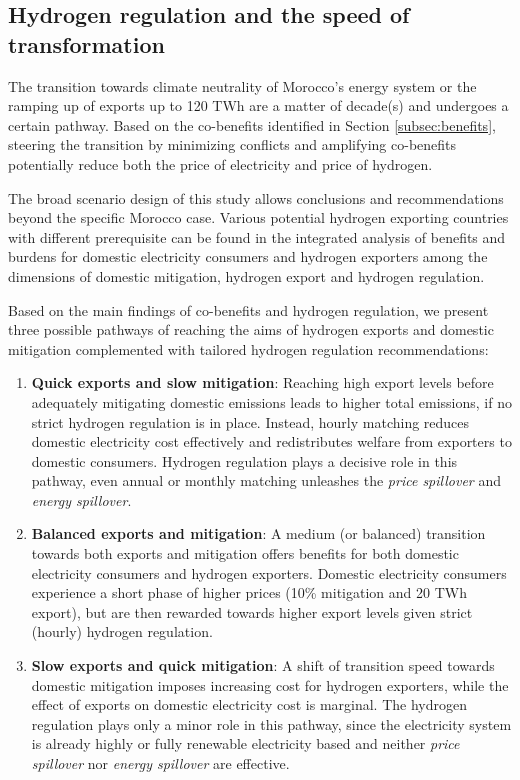 \subsection*{Hydrogen regulation and the speed of transformation}
\label{subsec:timepath}
The transition towards climate neutrality of Morocco's energy system or the ramping up of exports up to 120 TWh are a matter of decade(s) and undergoes a certain pathway. Based on the co-benefits identified in Section \ref{subsec:benefits}, steering the transition by minimizing conflicts and amplifying co-benefits potentially reduce both the price of electricity and price of hydrogen. 

The broad scenario design of this study allows conclusions and recommendations beyond the specific Morocco case.
Various potential hydrogen exporting countries with different prerequisite can be found in the integrated analysis of benefits and burdens for domestic electricity consumers and hydrogen exporters among the dimensions of domestic mitigation, hydrogen export and hydrogen regulation.

Based on the main findings of co-benefits and hydrogen regulation, we present three possible pathways of reaching the aims of hydrogen exports and domestic mitigation complemented with tailored hydrogen regulation recommendations:
\begin{enumerate}
    \item \textbf{Quick exports and slow mitigation}: Reaching high export levels before adequately mitigating domestic emissions leads to higher total emissions, if no strict hydrogen regulation is in place. Instead, hourly matching reduces domestic electricity cost effectively and redistributes welfare from exporters to domestic consumers. Hydrogen regulation plays a decisive role in this pathway, even annual or monthly matching unleashes the \textit{price spillover} and \textit{energy spillover}. 
    \item \textbf{Balanced exports and mitigation}: A medium (or balanced) transition towards both exports and mitigation offers benefits for both domestic electricity consumers and hydrogen exporters. Domestic electricity consumers experience a short phase of higher prices (10\% mitigation and 20 TWh export), but are then rewarded towards higher export levels given strict (hourly) hydrogen regulation.
    \item \textbf{Slow exports and quick mitigation}: A shift of transition speed towards domestic mitigation imposes increasing cost for hydrogen exporters, while the effect of exports on domestic electricity cost is marginal. The hydrogen regulation plays only a minor role in this pathway, since the electricity system is already highly or fully renewable electricity based and neither \textit{price spillover} nor \textit{energy spillover} are effective.
\end{enumerate}

